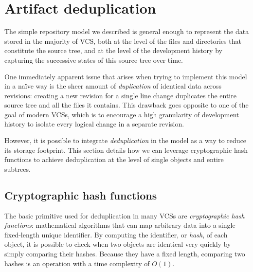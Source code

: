 \section{Artifact deduplication}

The simple repository model we described is general enough to represent the
data stored in the majority of \acrlong{VCS}, both at the level of the files
and directories that constitute the source tree, and at the level of the
development history by capturing the successive states of this source tree over
time.

One immediately apparent issue that arises when trying to implement this model
in a naïve way is the sheer amount of \emph{duplication} of identical data
across revisions: creating a new revision for a single line change duplicates
the entire source tree and all the files it contains. This drawback goes
opposite to one of the goal of modern \glspl{VCS}, which is to encourage a high
granularity of development history to isolate every logical change in a
separate revision.

However, it is possible to integrate \emph{deduplication} in the model as a way
to reduce its storage footprint. This section details how we can leverage
cryptographic hash functions to achieve deduplication at the level of single
objects and entire subtrees.

\subsection{Cryptographic hash functions}

The basic primitive used for deduplication in many \glspl{VCS} are
\emph{cryptographic hash functions}: mathematical algorithms that can map
arbitrary data into a single fixed-length unique identifier. By computing the
identifier, or \emph{hash}, of each object, it is possible to check when two
objects are identical very quickly by simply comparing their hashes. Because
they have a fixed length, comparing two hashes is an operation with a time
complexity of $O(1)$.

